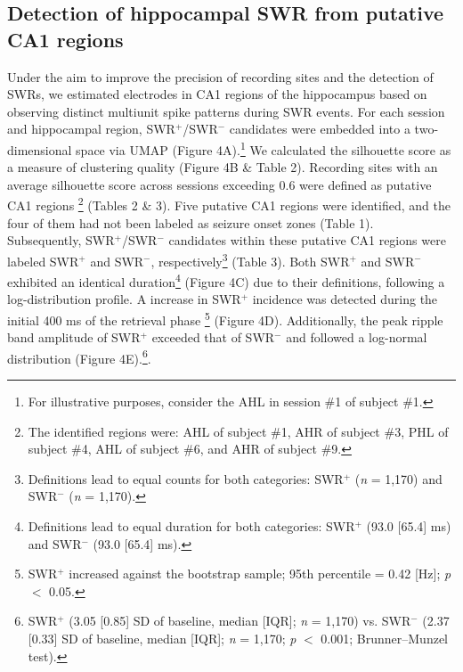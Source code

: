 \documentclass[final,3p,times,twocolumn]{elsarticle}
\begin{document}
\subsection{Detection of hippocampal SWR from putative CA1 regions}
Under the aim to improve the precision of recording sites and the detection of SWRs, we estimated electrodes in CA1 regions of the hippocampus based on observing distinct multiunit spike patterns during SWR events. For each session and hippocampal region, SWR$^+$/SWR$^-$ candidates were embedded into a two-dimensional space via UMAP (Figure 4A).\footnote{For illustrative purposes, consider the AHL in session \#1 of subject \#1.} We calculated the silhouette score as a measure of clustering quality (Figure 4B \& Table 2). Recording sites with an average silhouette score across sessions exceeding 0.6 were defined as putative CA1 regions \footnote{The identified regions were: AHL of subject \#1, AHR of subject \#3, PHL of subject \#4, AHL of subject \#6, and AHR of subject \#9.}  (Tables 2 \& 3). Five putative CA1 regions were identified, and the four of them had not been labeled as seizure onset zones (Table 1).
\\
\indent
Subsequently, SWR$^+$/SWR$^-$ candidates within these putative CA1 regions were labeled SWR$^+$ and SWR$^-$, respectively\footnote{Definitions lead to equal counts for both categories: SWR$^+$ (\textit{n} = 1,170) and SWR$^-$ (\textit{n} = 1,170).}  (Table 3). Both SWR$^+$ and SWR$^-$ exhibited an identical duration\footnote{Definitions lead to equal duration for both categories: SWR$^+$ (93.0 [65.4] ms) and SWR$^-$ (93.0 [65.4] ms).}  (Figure 4C) due to their definitions, following a log-distribution profile. A increase in SWR$^+$ incidence was detected during the initial 400 ms of the retrieval phase \footnote{SWR$^+$ increased against the bootstrap sample; 95th percentile = 0.42 [Hz]; \textit{p} $<$ 0.05.}  (Figure 4D). Additionally, the peak ripple band amplitude of SWR$^+$ exceeded that of SWR$^-$ and followed a log-normal distribution (Figure 4E).\footnote{SWR$^+$ (3.05 [0.85] SD of baseline, median [IQR]; \textit{n} = 1,170) vs. SWR$^-$ (2.37 [0.33] SD of baseline, median [IQR]; \textit{n} = 1,170; \textit{p} $<$ 0.001; Brunner--Munzel test).}.
\end{document}
